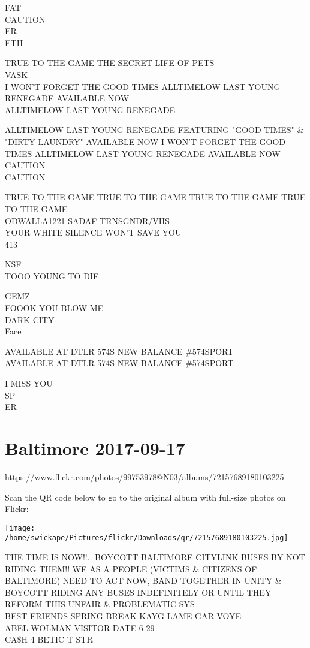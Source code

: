 \documentclass[10pt,letterpaper]{article}
\begin{document}
FAT\\
CAUTION\\
ER\\
ETH

TRUE TO THE GAME THE SECRET LIFE OF PETS\\
VASK\\
I WON'T FORGET THE GOOD TIMES ALLTIMELOW LAST YOUNG RENEGADE AVAILABLE NOW\\
ALLTIMELOW LAST YOUNG RENEGADE

ALLTIMELOW LAST YOUNG RENEGADE FEATURING "GOOD TIMES" \& "DIRTY LAUNDRY" AVAILABLE NOW I WON'T FORGET THE GOOD TIMES ALLTIMELOW LAST YOUNG RENEGADE AVAILABLE NOW\\
CAUTION\\
CAUTION

TRUE TO THE GAME TRUE TO THE GAME TRUE TO THE GAME TRUE TO THE GAME\\
ODWALLA1221 SADAF TRNSGNDR/VHS\\
YOUR WHITE SILENCE WON'T SAVE YOU\\
413

NSF\\
TOOO YOUNG TO DIE

GEMZ\\
FOOOK YOU BLOW ME\\
DARK CITY\\
Face

AVAILABLE AT DTLR 574S NEW BALANCE \#574SPORT\\
AVAILABLE AT DTLR 574S NEW BALANCE \#574SPORT

I MISS YOU\\
SP\\
ER
\pagebreak

\section*{Baltimore 2017-09-17}

\url{https://www.flickr.com/photos/99753978@N03/albums/72157689180103225}

Scan the QR code below to go to the original album with full-size photos on Flickr:

\texttt{[image: /home/swickape/Pictures/flickr/Downloads/qr/72157689180103225.jpg]}
\pagebreak

THE TIME IS NOW!!..  BOYCOTT BALTIMORE CITYLINK BUSES BY NOT RIDING THEM!!  WE AS A PEOPLE (VICTIMS \& CITIZENS OF BALTIMORE) NEED TO ACT NOW, BAND TOGETHER IN UNITY \& BOYCOTT RIDING ANY BUSES INDEFINITELY OR UNTIL THEY REFORM THIS UNFAIR \& PROBLEMATIC SYS\\
BEST FRIENDS SPRING BREAK KAYG LAME GAR VOYE\\
ABEL WOLMAN VISITOR DATE 6{-}29\\
CA\$H 4 BETIC T STR
\end{document}
